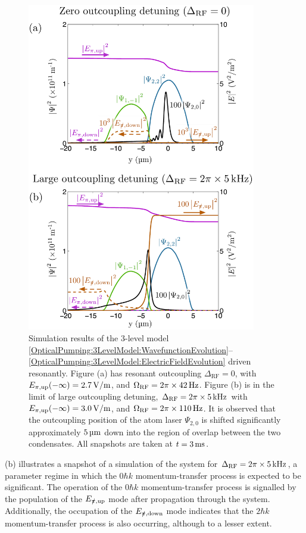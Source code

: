 \begin{figure}
    \centering
    \includegraphics[width=10cm]{3LevelParameterScanSnapshots}
    \caption{Simulation results of the 3-level model \eqref{OpticalPumping:3LevelModel:WavefunctionEvolution}--\eqref{OpticalPumping:3LevelModel:ElectricFieldEvolution} driven resonantly.  Figure (a) has resonant outcoupling $\Delta_\text{RF} = 0$, with $E_{\pi,\text{up}}(-\infty) = \unit[2.7]{V/m}$, and $\Omega_\text{RF} = 2\pi\times\unit[42]{Hz}$. Figure (b) is in the limit of large outcoupling detuning, $\Delta_\text{RF} = 2 \pi \times \unit[5]{kHz}$ with $E_{\pi, \text{up}}(-\infty) = \unit[3.0]{V/m}$, and $\Omega_\text{RF} = 2\pi\times\unit[110]{Hz}$.  It is observed that the outcoupling position of the atom laser $\Psi_{2, 0}$ is shifted significantly approximately $\unit[5]{\micro m}$ down into the region of overlap between the two condensates. All snapshots are taken at $t = \unit[3]{ms}$.}
    \label{OpticalPumping:3LevelParameterScanSnapshots}
\end{figure}

(b) illustrates a snapshot of a simulation of the system for $\Delta_\text{RF} = 2\pi \times \unit[5]{kHz}$, a parameter regime in which the $0 \hbar k$ momentum-transfer process is expected to be significant.  The operation of the $0 \hbar k$ momentum-transfer process is signalled by the population of the $E_{\slashed{\pi}, \text{up}}$ mode after propagation through the system.  Additionally, the occupation of the $E_{\slashed{\pi}, \text{down}}$ mode indicates that the $2 \hbar k$ momentum-transfer process is also occurring, although to a lesser extent.  

